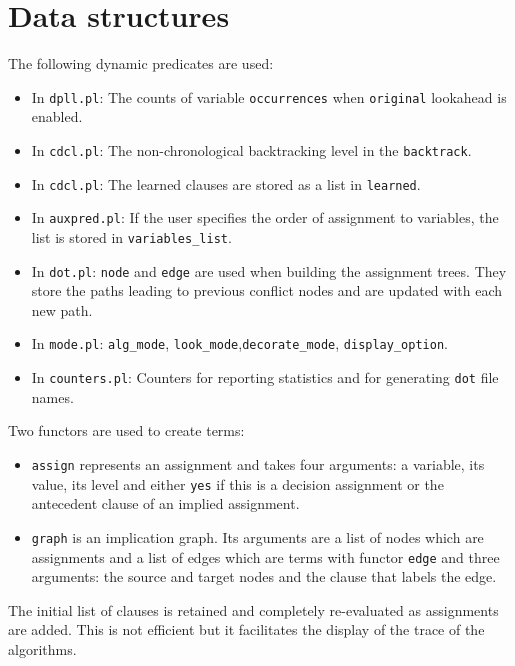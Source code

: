 \documentclass[11pt]{article}
\newcommand*{\p}[1]{\textup{\texttt{#1}}}
\begin{document}
\section{Data structures}

The following dynamic predicates are used:
\begin{itemize}

\item In \p{dpll.pl}: The counts of variable \p{occurrences} when \p{original} lookahead is enabled.

\item In \p{cdcl.pl}: The non-chronological backtracking level in the \p{backtrack}.

\item In \p{cdcl.pl}: The learned clauses are stored as a list in \p{learned}.

\item In \p{auxpred.pl}: If the user specifies the order of assignment
to variables, the list is stored in \p{variables\_list}.

\item In \p{dot.pl}: \p{node} and \p{edge} are used when building the assignment trees. They store the paths leading to previous conflict nodes and are updated with each new path.

\item In \p{mode.pl}: \p{alg\_mode}, \p{look\_mode},\p{decorate\_mode}, \p{display\_option}.

\item In \p{counters.pl}: Counters for reporting statistics and for generating \p{dot} file names.
\end{itemize}

Two functors are used to create terms:
\begin{itemize}

\item \p{assign} represents an assignment and takes four arguments: a
variable, its value, its level and either \p{yes} if this is a decision
assignment or the antecedent clause of an implied assignment.

\item \p{graph} is an implication graph. Its arguments are a list of
nodes which are assignments and a list of edges which are terms with
functor \p{edge} and three arguments: the source and target nodes
and the clause that labels the edge.
\end{itemize}

The initial list of clauses is retained and completely re-evaluated as assignments are added. This is not efficient but it facilitates the display of the trace of the algorithms.
\end{document}
